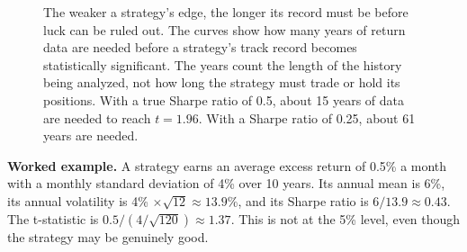 \begin{figure}[!htbp]
  \centering
  \caption{The weaker a strategy's edge, the longer its record must be before luck can be ruled out. The curves show how many years of return data are needed before a strategy's track record becomes statistically significant. The years count the length of the history being analyzed, not how long the strategy must trade or hold its positions. With a true Sharpe ratio of 0.5, about 15 years of data are needed to reach $t = 1.96$. With a Sharpe ratio of 0.25, about 61 years are needed.}
  \label{fig:01-years}
\end{figure}


\textbf{Worked example.} A strategy earns an average excess return of 0.5\% a month with a monthly standard deviation of 4\% over 10 years. Its annual mean is 6\%, its annual volatility is 4\% $\times \sqrt{12} \approx 13.9$\%, and its Sharpe ratio is $6/13.9 \approx 0.43$. The t-statistic is $0.5 / (4/\sqrt{120}) \approx 1.37$. This is not  at the 5\% level, even though the strategy may be genuinely good.


